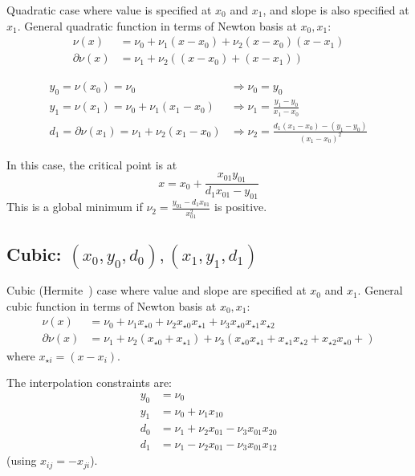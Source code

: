 Quadratic case where value is specified at $x_0$ and $x_1$,
and slope is also specified at $x_1$.
General quadratic function in terms of Newton basis at
$x_0, x_1$:
\begin{align}
\nu(x) & = \nu_0 + \nu_1 (x - x_0) + \nu_2 (x - x_0) (x - x_1) 
\\
\partial{\nu}(x) & = \nu_1 + \nu_2 \left( (x - x_0) + (x - x_1) \right)
\nonumber
\end{align}

\begin{align}
y_0 = \nu(x_0) = \nu_0 & \Rightarrow \nu_0 = y_0 
\\
y_1 = \nu(x_1) = \nu_0 + \nu_1 (x_1 - x_0) & \Rightarrow 
\nu_1 = \frac{y_1-y_0}{x_1 - x_0} 
\nonumber \\
d_1 = \partial{\nu}(x_1) = \nu_1 + \nu_2 (x_1 - x_0) & \Rightarrow 
\nu_2 = \frac{d_1 (x_1 - x_0) - (y_1-y_0)}{(x_1 - x_0)^2} 
\nonumber
\end{align}

In this case, the critical point is at
\begin{equation}
x = x_0 + \frac{x_{01} y_{01}}{d_1 x_{01} - y_{01}}
\end{equation}
This is a global minimum if 
$\nu_2 = \frac{y_{01} - d_1 x_{01}}{x_{01}^2}$
is positive.

\subsection{Cubic: $(x_0,y_0,d_0),(x_1,y_1,d_1)$}

Cubic (Hermite~\cite{wiki:cubic-hermite-spline}) 
case where value and slope are specified at $x_0$ and $x_1$.
General cubic function in terms of Newton basis at
$x_0, x_1$:
\begin{align}
\nu(x) & = \nu_0 + \nu_1 x_{{\star}0} + \nu_2 x_{{\star}0} x_{{\star}1} 
 + \nu_3 x_{{\star}0} x_{{\star}1} x_{{\star}2} \\
\partial{\nu}(x) & = \nu_1 
+ \nu_2 \left( x_{{\star}0} + x_{{\star}1} \right) 
+ \nu_3 \left( 
 x_{{\star}0} x_{{\star}1} +
 x_{{\star}1} x_{{\star}2} +
 x_{{\star}2} x_{{\star}0} +
\right)
\nonumber
\end{align}
where $x_{{\star}i} = \left(x - x_i\right)$.

The interpolation constraints are:
\begin{align}
y_0 & = \nu_0 
\\
y_1 & = \nu_0 + \nu_1 x_{10}  
\nonumber 
\\
d_0 & = \nu_1 + \nu_2 x_{01} - \nu_3 x_{01} x_{20} 
\\
d_1 & = \nu_1 - \nu_2 x_{01} - \nu_3 x_{01} x_{12} 
\nonumber
\end{align}
(using $x_{ij} = - x_{ji}$).

